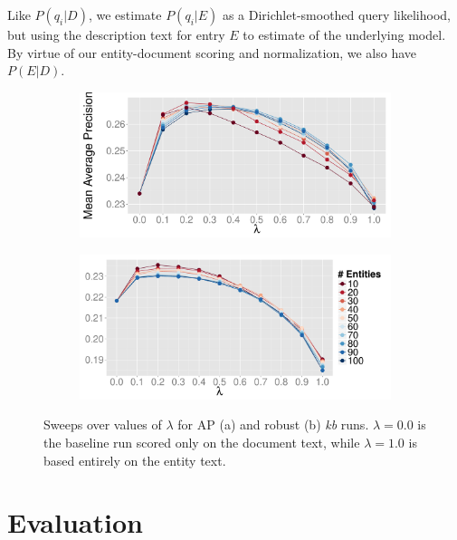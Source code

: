\documentclass{sig-alternate}
\begin{document}
\noindent Like $P(q_i|D)$, we estimate $P(q_i|E)$ as a Dirichlet-smoothed query likelihood, but using the description text for entry $E$ to estimate of the underlying model. By virtue of our entity-document scoring and normalization, we also have $P(E|D)$.

\begin{figure}[!htb]
\centering
\begin{subfigure}{\columnwidth}
\centering
\includegraphics[width=.9\columnwidth]{figures/sweep-entities-AP.pdf}
\end{subfigure}%
\begin{subfigure}{\columnwidth}
\centering
\includegraphics[width=.9\columnwidth]{figures/sweep-entities-robust.pdf}
\end{subfigure}
\caption{Sweeps over values of $\lambda$ for AP (a) and robust (b) \textit{kb} runs. $\lambda=0.0$ is the baseline run scored only on the document text, while $\lambda=1.0$ is based entirely on the entity text.}
\label{figure.sweeps-ql}
\end{figure}

\section{Evaluation}\label{section.evaluation}
\end{document}
